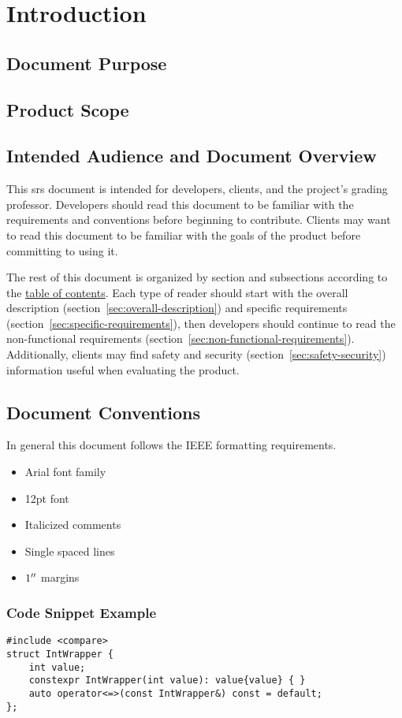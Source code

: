 
\section{Introduction}\label{sec:introduction}
    \subsection{Document Purpose}\label{sec:document-purpose}
    \subsection{Product Scope}\label{sec:product-scope}
    \subsection{Intended Audience and Document Overview}\label{sec:audience-overview}
        This \gls{srs} document is intended for developers, clients, and the project's grading professor. Developers should read this document to be familiar with the requirements and conventions before beginning to contribute. Clients may want to read this document to be familiar with the goals of the product before committing to using it.
        \par The rest of this document is organized by section and subsections according to the \hyperref[toc]{table of contents}. Each type of reader should start with the overall description (section~\ref{sec:overall-description}) and specific requirements (section~\ref{sec:specific-requirements}), then developers should continue to read the non-functional requirements (section~\ref{sec:non-functional-requirements}). Additionally, clients may find safety and security (section~\ref{sec:safety-security}) information useful when evaluating the product.
    \subsection{Document Conventions}\label{sec:document-conventions}
        In general this document follows the IEEE formatting requirements.
        \begin{itemize}
            \item Arial font family
            \item 12pt font
            \item Italicized comments
            \item Single spaced lines
            \item $1^{\prime\prime}$ margins
        \end{itemize}

        \subsubsection{Code Snippet Example}\label{sec:code-snippet-example}
            \begin{verbatim}
#include <compare>
struct IntWrapper {
    int value;
    constexpr IntWrapper(int value): value{value} { }
    auto operator<=>(const IntWrapper&) const = default;
};
            \end{verbatim}

